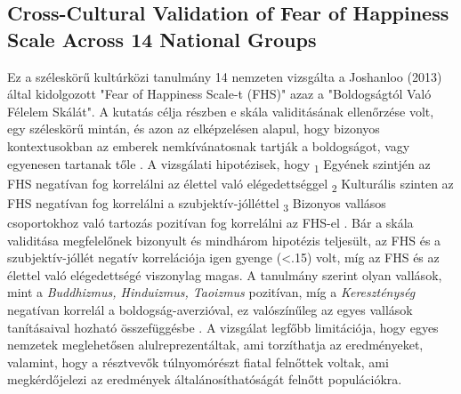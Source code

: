 \subsection*{Cross-Cultural Validation of
	Fear of Happiness Scale Across 14 National Groups \cite{joshanloo_lepshokova_panyusheva_natalia_poon_yeung_sundaram_achoui_asano_igarashi}}
Ez a széleskörű kultúrközi tanulmány 14 nemzeten vizsgálta a Joshanloo (2013) által kidolgozott "Fear of Happiness Scale-t (FHS)" azaz a "Boldogságtól Való Félelem Skálát". A kutatás célja részben e skála validitásának ellenőrzése volt, egy széleskörű mintán, és azon az elképzelésen alapul, hogy bizonyos kontextusokban az emberek nemkívánatosnak tartják a boldogságot, vagy egyenesen tartanak tőle \cite{joshanloo_lepshokova_panyusheva_natalia_poon_yeung_sundaram_achoui_asano_igarashi}. A vizsgálati hipotézisek, hogy \textsubscript{1} Egyének szintjén az FHS negatívan fog korrelálni az élettel való elégedettséggel \textsubscript{2} Kulturális szinten az FHS negatívan fog korrelálni a szubjektív-jólléttel \textsubscript{3} Bizonyos vallásos csoportokhoz való tartozás pozitívan fog korrelálni az FHS-el \cite{joshanloo_lepshokova_panyusheva_natalia_poon_yeung_sundaram_achoui_asano_igarashi}. Bár a skála validitása megfelelőnek bizonyult és mindhárom hipotézis teljesült, az FHS és a szubjektív-jóllét negatív korrelációja igen gyenge (\textless.15) volt, míg az FHS és az élettel való elégedettségé viszonylag magas. A tanulmány szerint olyan vallások, mint a \textit{Buddhizmus, Hinduizmus, Taoizmus} pozitívan, míg a \textit{Kereszténység} negatívan korrelál a boldogság-averzióval, ez valószínűleg az egyes vallások tanításaival hozható összefüggésbe \cite{joshanloo_lepshokova_panyusheva_natalia_poon_yeung_sundaram_achoui_asano_igarashi}. A vizsgálat legfőbb limitációja, hogy egyes nemzetek meglehetősen alulreprezentáltak, ami torzíthatja az eredményeket, valamint, hogy a résztvevők túlnyomórészt fiatal felnőttek voltak, ami megkérdőjelezi az eredmények általánosíthatóságát felnőtt populációkra.

